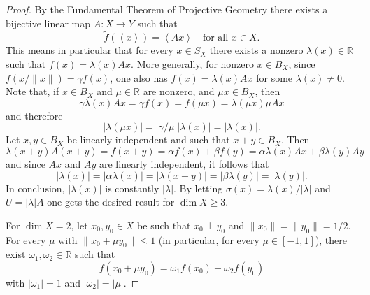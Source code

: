\documentclass{memo-l}
\theoremstyle{definition}
\theoremstyle{remark}
\numberwithin{section}{chapter}
\numberwithin{equation}{chapter}
\newcommand\R{\ensuremath{\mathbb{R}}}
\begin{document}
\begin{proof}
    By the Fundamental Theorem of Projective Geometry there exists a
    bijective linear map $A\colon X\to Y$ such that
    \[
    \tilde f(\left< x \right>)=\left< Ax \right>\quad\text{for all }x \in
    X.
    \]
    This means in particular that for every $x \in S_X$ there exists a
    nonzero $\lambda (x)\in \R$ such that $f(x)=\lambda (x)Ax$. More
    generally, for nonzero $x \in B_X$, since $f(x/\|x\|)=\gamma
    f(x)$, one also has $f(x)=\lambda (x)Ax$ for some $\lambda (x)\neq
    0$. Note that, if $x \in B_X$ and $\mu \in \R$ are nonzero, and
    $\mu x \in B_X$, then
    \[
    \gamma \lambda (x)Ax=\gamma f(x)=f(\mu x)=\lambda (\mu x) \mu Ax
    \]
    and therefore
    \[
    |\lambda (\mu x)|=|\gamma/\mu | |\lambda (x)|=|\lambda (x)|.
    \]
    Let $x,y \in B_X$ be linearly independent and such that $x+y
    \in B_X$. Then
    \[
    \lambda (x+y)A(x+y)=f(x+y)=\alpha f(x)+\beta f(y)=\alpha \lambda
    (x)Ax+\beta \lambda (y) Ay
    \]
    and since $Ax$ and $Ay$ are linearly independent, it follows that
    \[
    |\lambda (x)|=|\alpha \lambda (x)|=|\lambda (x+y)|=|\beta \lambda
    (y)|=|\lambda (y)|.
    \]
    In conclusion, $|\lambda (x)|$ is constantly $|\lambda |$. By
    letting $\sigma (x)=\lambda (x)/|\lambda |$ and $U=|\lambda |A$
    one gets the desired result for $\dim X\ge 3$.

    For $\dim X=2$, let $x_0,y_0 \in X$ be such that $x_0 \perp y_0$
    and $\|x_0\|=\|y_0\|=1/2$. For every
    $\mu $ with $\|x_0+\mu y_0\|\le 1$ (in particular, for every $\mu
    \in [-1,1]$), there exist $\omega _1, \omega _2 \in \R$ such that
    \[
    f(x_0+\mu y_0)=\omega _1 f(x_0)+\omega _2f(y_0)
    \]
    with $|\omega _1|=1$ and $|\omega _2|=|\mu| $.


\end{proof}
\end{document}
